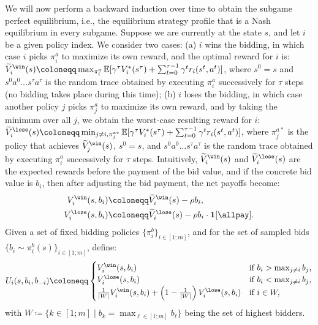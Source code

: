 We will now perform a backward induction over time to obtain the subgame perfect equilibrium, i.e., the equilibrium strategy profile that is a Nash equilibrium in every subgame.
Suppose we are currently at the state $s$, and let $i$ be a given policy index. 
We consider two cases:
(a) $i$ wins the bidding, in which case $i$ picks $\pi_i^a$ to maximize its own reward, and the optimal reward for $i$ is: $\widetilde V_i^{\win}(s) \coloneqq \max_{\pi_i^a} \mathbb{E}[\gamma^\tau V_i^*(s^\tau)+\sum_{t=0}^{\tau-1} \gamma^t r_i(s^t,a^t)]$, where $s^0=s$ and $s^0a^0\ldots s^\tau a^\tau$ is the random trace obtained by executing $\pi_i^a$ successively for $\tau$ steps (no bidding takes place during this time);
(b) $i$ loses the bidding, in which case another policy $j$ picks $\pi_j^a$ to maximize its own reward, and by taking the minimum over all $j$, we obtain the worst-case resulting reward for $i$:
$\widetilde V_i^{\lose}(s) \coloneqq \min_{j\neq i,\pi_j^{a*}} \mathbb{E}[\gamma^\tau V_i^*(s^\tau) + \sum_{t=0}^{\tau-1} \gamma^t r_i(s^t,a^t)]$, where $\pi_j^{a*}$ is the policy that achieves $\widetilde V_j^{\win}(s)$, $s^0=s$, and $s^0a^0\ldots s^\tau a^\tau$ is the random trace obtained by executing $\pi_i^a$ successively for $\tau$ steps.
Intuitively, $\widetilde V_i^{\win}(s)$ and $\widetilde V_i^{\lose}(s)$ are the expected rewards before the payment of the bid value, and if the concrete bid value is $b_i$, then after adjusting the bid payment, the net payoffs become:
\begin{align*}
	V_i^{\win}(s,b_i) &\coloneqq \widetilde V_i^{\win}(s) - \rho b_i,\\
	V_i^{\lose}(s,b_i) &\coloneqq \widetilde V_i^{\lose}(s) - \rho b_i\cdot \mathbf{1}[\text{\allpay}].
\end{align*}
Given a set of fixed bidding policies $\{\pi_i^b\}_{i\in [1;m]}$, and for the set of sampled bids $\{b_i\sim\pi_i^b(s)\}_{i\in [1;m]}$, define:
\begin{align*}
	U_i(s,b_i,b_{-i}) \coloneqq
		\begin{cases}
			V_i^{\win}(s,b_i) & \text{if } b_i > \max_{j\neq i} b_j,\\
			V_i^{\lose}(s,b_i) & \text{if } b_i < \max_{j\neq i} b_j,\\
			\frac{1}{|W|}V_i^{\win}(s,b_i) + \left(1-\frac{1}{|W|}\right)V_i^{\lose}(s,b_i) & \text{if } i\in W,
		\end{cases}
\end{align*}
with $W\coloneqq \{k\in [1;m]\mid b_k=\max_{\ell\in [1;m]} b_\ell\}$ being the set of highest bidders.
